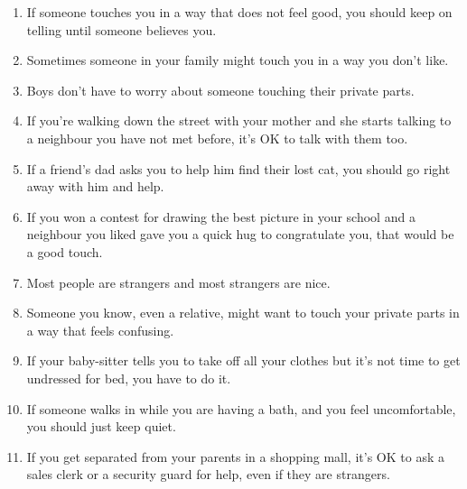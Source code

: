 \begin{anexosenv}
\begin{enumerate}
	\item If someone touches you in a way that does not feel good, you should keep on telling until someone believes you.
	\item Sometimes someone in your family might touch you in a way you don't like.
	\item Boys don't have to worry about someone touching their private parts.
	\item If you're walking down the street with your mother and she starts talking to a neighbour you have not met before, it's OK to talk with them too.
	\item If a friend's dad asks you to help him find their lost cat, you should go right away with him and help.
	\item If you won a contest for drawing the best picture in your school and a neighbour you liked gave you a quick hug to congratulate you, that would be a good touch.
	\item Most people are strangers and most strangers are nice.
	\item Someone you know, even a relative, might want to touch your private parts in a way that feels confusing.
	\item If your baby-sitter tells you to take off all your clothes but it's not time to get undressed for bed, you have to do it.
	\item If someone walks in while you are having a bath, and you feel uncomfortable, you should just keep quiet.
	\item If you get separated from your parents in a shopping mall, it's OK to ask a sales clerk or a security guard for help, even if they are strangers. 
\end{enumerate}






\end{anexosenv}
